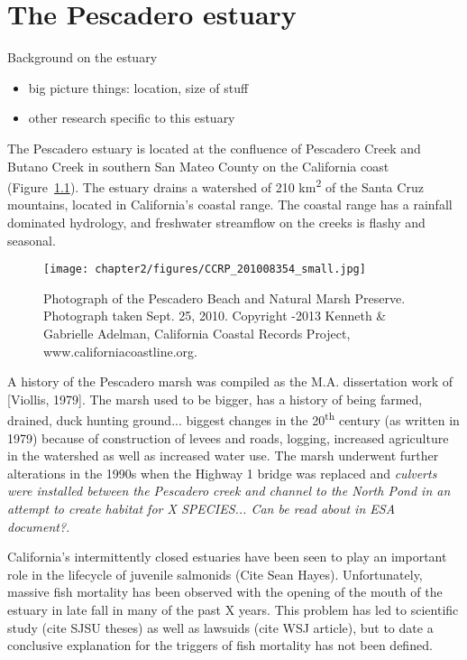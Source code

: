 \chapter{The Pescadero estuary} \label{chPescadero}

Background on the estuary

\begin{itemize} \item  big picture things: location, size of stuff \item
other research specific to this estuary \end{itemize}

The Pescadero estuary is located at the confluence of Pescadero Creek
and Butano Creek in southern San Mateo County on the California coast (Figure~\ref{fig:ccrp_2010}).
The estuary drains a watershed of 210 km\textsuperscript{2} of the Santa
Cruz mountains, located in California's coastal range. The coastal range
has a rainfall dominated hydrology, and freshwater streamflow on the
creeks is flashy and seasonal.


% 
\begin{figure}
\texttt{[image: chapter2/figures/CCRP\_201008354\_small.jpg]} \caption{Photograph of the Pescadero Beach and Natural Marsh Preserve. Photograph taken Sept. 25,
2010. Copyright -2013 Kenneth \& Gabrielle
Adelman, California Coastal Records Project,
www.californiacoastline.org.} \label{fig:ccrp_2010} \end{figure}


A history of the Pescadero marsh was compiled as
the M.A. dissertation work of [Viollis, 1979]. The marsh used to be
bigger, has a history of being farmed, drained, duck hunting ground...
biggest changes in the 20\textsuperscript{th} century (as written in
1979) because of construction of levees and roads, logging, increased
agriculture in the watershed as well as increased water use. The marsh underwent further alterations in the 1990s when the Highway 1 bridge was replaced and \emph{culverts were installed between the Pescadero creek and channel to the North Pond in an attempt to create habitat for X SPECIES... Can be read about in ESA document?}.

California's intermittently closed estuaries have been seen to play an important role in the lifecycle of juvenile salmonids (Cite Sean Hayes). Unfortunately, massive fish mortality has been observed with the opening of the mouth of the estuary in late fall in many of the past X years. This problem has led to scientific study (cite SJSU theses) as well as lawsuids (cite WSJ article), but to date a conclusive explanation for the triggers of fish mortality has not been defined. 

